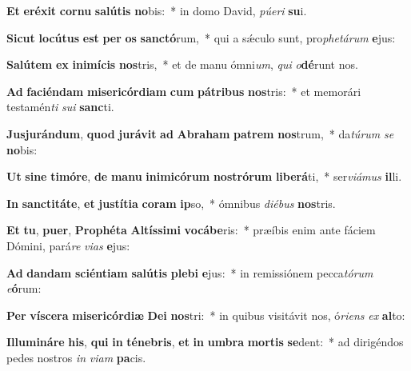 \item \textbf{Et} \textbf{e}\textbf{ré}\textbf{xit} \textbf{cor}\textbf{nu} \textbf{sa}\textbf{lú}\textbf{tis} \textbf{no}bis:~* in domo David, \textit{pú}\textit{e}\textit{ri} \textbf{su}i.
\item \textbf{Sic}\textbf{ut} \textbf{lo}\textbf{cú}\textbf{tus} \textbf{est} \textbf{per} \textbf{os} \textbf{sanc}\textbf{tó}rum,~* qui a sǽculo sunt, pro\textit{phe}\textit{tá}\textit{rum} \textbf{e}jus:
\item \textbf{Sa}\textbf{lú}\textbf{tem} \textbf{ex} \textbf{in}\textbf{i}\textbf{mí}\textbf{cis} \textbf{nos}tris,~* et de manu ómni\textit{um}, \textit{qui} \textit{o}\textbf{dé}runt nos.
\item \textbf{Ad} \textbf{fa}\textbf{ci}\textbf{én}\textbf{dam} \textbf{mi}\textbf{se}\textbf{ri}\textbf{cór}\textbf{di}\textbf{am} \textbf{cum} \textbf{pá}\textbf{tri}\textbf{bus} \textbf{nos}tris:~* et memorári testamén\textit{ti} \textit{su}\textit{i} \textbf{sanc}ti.
\item \textbf{Ju}\textbf{sju}\textbf{rán}\textbf{dum}, \textbf{quod} \textbf{ju}\textbf{rá}\textbf{vit} \textbf{ad} \textbf{A}\textbf{bra}\textbf{ham} \textbf{pa}\textbf{trem} \textbf{nos}trum,~* da\textit{tú}\textit{rum} \textit{se} \textbf{no}bis:
\item \textbf{Ut} \textbf{si}\textbf{ne} \textbf{ti}\textbf{mó}\textbf{re}, \textbf{de} \textbf{ma}\textbf{nu} \textbf{in}\textbf{i}\textbf{mi}\textbf{có}\textbf{rum} \textbf{nos}\textbf{tró}\textbf{rum} \textbf{li}\textbf{be}\textbf{rá}ti,~* ser\textit{vi}\textit{á}\textit{mus} \textbf{il}li.
\item \textbf{In} \textbf{sanc}\textbf{ti}\textbf{tá}\textbf{te}, \textbf{et} \textbf{jus}\textbf{tí}\textbf{ti}\textbf{a} \textbf{co}\textbf{ram} \textbf{ip}so,~* ómnibus \textit{di}\textit{é}\textit{bus} \textbf{nos}tris.
\item \textbf{Et} \textbf{tu}, \textbf{pu}\textbf{er}, \textbf{Pro}\textbf{phé}\textbf{ta} \textbf{Al}\textbf{tís}\textbf{si}\textbf{mi} \textbf{vo}\textbf{cá}\textbf{be}ris:~* præíbis enim ante fáciem Dómini, pará\textit{re} \textit{vi}\textit{as} \textbf{e}jus:
\item \textbf{Ad} \textbf{dan}\textbf{dam} \textbf{sci}\textbf{én}\textbf{ti}\textbf{am} \textbf{sa}\textbf{lú}\textbf{tis} \textbf{ple}\textbf{bi} \textbf{e}jus:~* in remissiónem pecca\textit{tó}\textit{rum} \textit{e}\textbf{ó}rum:
\item \textbf{Per} \textbf{ví}\textbf{sce}\textbf{ra} \textbf{mi}\textbf{se}\textbf{ri}\textbf{cór}\textbf{di}\textbf{æ} \textbf{De}\textbf{i} \textbf{nos}tri:~* in quibus visitávit nos, ó\textit{ri}\textit{ens} \textit{ex} \textbf{al}to:
\item \textbf{Il}\textbf{lu}\textbf{mi}\textbf{ná}\textbf{re} \textbf{his}, \textbf{qui} \textbf{in} \textbf{té}\textbf{ne}\textbf{bris}, \textbf{et} \textbf{in} \textbf{um}\textbf{bra} \textbf{mor}\textbf{tis} \textbf{se}dent:~* ad dirigéndos pedes nostros \textit{in} \textit{vi}\textit{am} \textbf{pa}cis.
